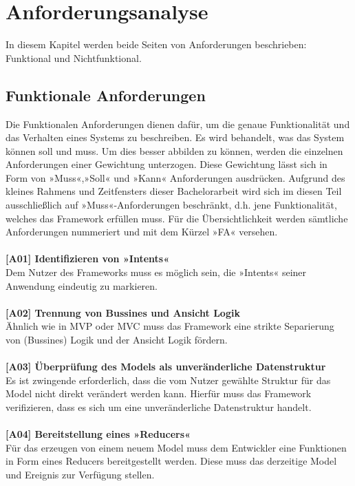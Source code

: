 \section{Anforderungsanalyse}
\label{sec:anforderungsanalyse}
In diesem Kapitel werden beide Seiten von Anforderungen beschrieben: Funktional und Nichtfunktional. 

\subsection{Funktionale Anforderungen}
Die Funktionalen Anforderungen dienen dafür, um die genaue Funktionalität und das Verhalten eines Systems zu beschreiben. Es wird behandelt, was das System können soll und muss. Um dies besser abbilden zu können, werden die einzelnen Anforderungen einer Gewichtung unterzogen. Diese Gewichtung lässt sich in Form von »Muss«,»Soll« und »Kann« Anforderungen ausdrücken. Aufgrund des kleines Rahmens und Zeitfensters dieser Bachelorarbeit wird sich im diesen Teil ausschließlich auf »Muss«-Anforderungen beschränkt, d.h. jene Funktionalität, welches das Framework erfüllen muss. Für die Übersichtlichkeit werden sämtliche Anforderungen nummeriert und mit dem Kürzel »FA« versehen.
\\
\\
\textbf{[A01] Identifizieren von »Intents«}
\\
Dem Nutzer des Frameworks muss es möglich sein, die »Intents« seiner Anwendung eindeutig zu markieren.
\\
\\
\textbf{[A02] Trennung von Bussines und Ansicht Logik}
\\
Ähnlich wie in MVP oder MVC muss das Framework eine strikte Separierung von (Bussines) Logik und der Ansicht Logik fördern. 
\\
\\
\textbf{[A03] Überprüfung des Models als unveränderliche Datenstruktur}
\\
Es ist zwingende erforderlich, dass die vom Nutzer gewählte Struktur für das Model nicht direkt verändert werden kann. Hierfür muss das Framework verifizieren, dass es sich um  eine  unveränderliche Datenstruktur
handelt.
\\
\\
\textbf{[A04] Bereitstellung eines »Reducers«}
\\
Für das erzeugen von einem neuem Model muss dem Entwickler eine Funktionen in Form eines Reducers bereitgestellt werden. Diese muss das derzeitige Model und Ereignis zur Verfügung stellen. 
